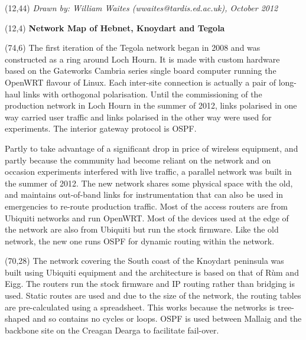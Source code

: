 \documentclass[noborder,onecolumn]{netmap}
\begin{document}
\begin{textblock}{32}(12,44)
  \textit{Drawn by: William Waites (wwaites@tardis.ed.ac.uk), October 2012}
\end{textblock}
\begin{textblock}{32}(12,4)
  \textbf{\Huge Network Map of Hebnet, Knoydart and Tegola}
\end{textblock}
\begin{textblock}{10}(74,6)
  \linespread{1.0}
  \scriptsize
  The first iteration of the Tegola network began in 2008 and was
    constructed as a ring around Loch Hourn. It is made with custom
    hardware based on the Gateworks Cambria series single board computer
    running the OpenWRT flavour of Linux. Each inter-site connection is
    actually a pair of long-haul links with orthogonal polarisation. Until
    the commissioning of the production network in Loch Hourn in the
    summer of 2012, links polarised in one way carried user traffic and
    links polarised in the other way were used for experiments. The
    interior gateway protocol is OSPF.

    Partly to take advantage of a significant drop in price of
    wireless equipment, and partly because the community had become
    reliant on the network and on occasion experiments
    interfered with live traffic, a parallel network was built in the
    summer of 2012. The new network shares some physical space with the
    old, and maintains out-of-band links for instrumentation that can also
    be used in emergencies to re-route production traffic. Most of the
    access routers are from Ubiquiti networks and run OpenWRT. Most of the
    devices used at the edge of the network are also from Ubiquiti but run
    the stock firmware.  Like the old network, the new one runs OSPF for
    dynamic routing within the network.
\end{textblock}
\begin{textblock}{10}(70,28)
  \linespread{1.0}
  \scriptsize
  The network covering the South coast of the Knoydart peninsula was
  built using Ubiquiti equipment and the architecture is based on that
  of Rùm and Eigg. The routers run the stock firmware and IP routing
  rather than bridging is used. Static routes are used and due to the
  size of the network, the routing tables are pre-calculated using a
  spreadsheet. This works because the networks is tree-shaped and so
  contains no cycles or loops. OSPF is used between Mallaig and the
  backbone site on the Creagan Dearga to facilitate fail-over.
\end{textblock}
\end{document}
